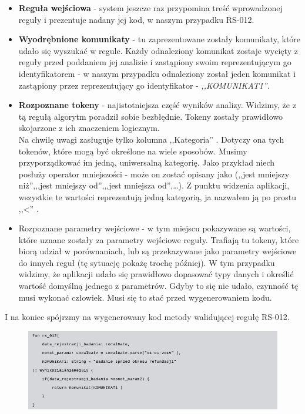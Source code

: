 \begin{itemize}
	\item \textbf{Reguła wejściowa} - system jeszcze raz przypomina treść wprowadzonej reguły i prezentuje nadany jej kod, w naszym przypadku RS-012.
	\item \textbf{Wyodrębnione komunikaty} - tu zaprezentowane zostały komunikaty, które udało się wyszukać w regule. Każdy odnaleziony komunikat zostaje wycięty z reguły przed poddaniem jej analizie i zastąpiony swoim reprezentującym go identyfikatorem - w naszym przypadku odnaleziony został jeden komunikat i zastąpiony przez reprezentujący go identyfikator - \textit{,,KOMUNIKAT1''}.
	\item \textbf{Rozpoznane tokeny} - najistotniejsza część wyników analizy. Widzimy, że z tą regułą algorytm poradził sobie bezbłędnie. Tokeny zostały prawidłowo skojarzone z ich znaczeniem logicznym. \\
	Na chwilę uwagi zasługuje tylko kolumna ,,Kategoria'' . Dotyczy ona tych tokenów, które mogą być określone na wiele sposobów. Musimy przyporządkować im jedną, uniwersalną kategorię. Jako przykład niech posłuży operator mniejszości - może on zostać opisany jako (,,jest mniejszy niż'',,,jest mniejszy od'',,,jest mniejsza od'',\dots). Z punktu widzenia aplikacji, wszystkie te wartości reprezentują jedną kategorią, ja nazwałem ją po prostu ,,<'' .
	\item {Rozpoznane parametry wejściowe} - w tym miejscu pokazywane są wartości, które uznane zostały za parametry wejściowe reguły. Trafiają tu tokeny, które biorą udział w porównaniach, lub są przekazywane jako parametry wejściowe do innych reguł (tę sytuację pokażę trochę później). W tym przypadku widzimy, że aplikacji udało się prawidłowo dopasować typy danych i określić wartość domyślną jednego z parametrów. Gdyby to się nie udało, czynność tę musi wykonać człowiek. Musi się to stać przed wygenerowaniem kodu.
\end{itemize}


I na koniec spójrzmy na wygenerowany kod metody walidującej regułę RS-012.
\begin{figure}[H]
	\centering
	\includegraphics[scale=0.8]{img/app-eksperymenty/p1-3.png}
\end{figure}

